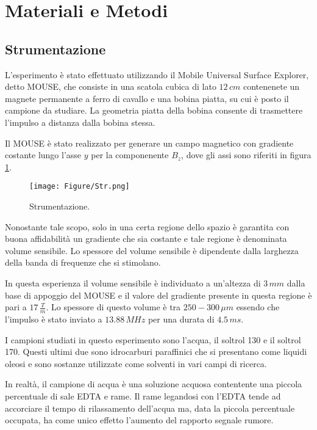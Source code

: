 \section*{Materiali e Metodi}

\subsection*{Strumentazione}

L'esperimento è stato effettuato utilizzando il Mobile Universal Surface Explorer, detto MOUSE, che consiste in una scatola cubica di lato $12\,cm$ contenenete un magnete permanente a ferro di cavallo e una bobina piatta, su cui è posto il campione da studiare. 
La geometria piatta della bobina consente di trasmettere l'impulso a distanza dalla bobina stessa. 

Il MOUSE è stato realizzato per generare un campo magnetico con gradiente costante lungo l'asse $y$ per la componenente $B_z$, dove gli assi sono riferiti in figura \ref{fig:Str.png}. 

\begin{figure}[h!]
\centering
\texttt{[image: Figure/Str.png]}
\caption{Strumentazione.}
\label{fig:Str.png}
\end{figure}

Nonostante tale scopo, solo in una certa regione dello spazio è garantita con buona affidabilità un gradiente che sia costante e tale regione è denominata volume sensibile.
Lo spessore del volume sensibile è dipendente dalla larghezza della banda di frequenze che si stimolano.

In questa esperienza il volume sensibile è individuato a un'altezza di $3\,mm$ dalla base di appoggio del MOUSE e il valore del gradiente presente in questa regione è pari a $17\, \frac{T}{m}$.
Lo spessore di questo volume è tra $250-300\, \mu m$ essendo che l'impulso è stato inviato a $13.88\,MHz$ per una durata di $4.5\,ms$. 

I campioni studiati in questo esperimento sono l'acqua, il soltrol 130 e il soltrol 170.
Questi ultimi due sono idrocarburi paraffinici che si presentano come liquidi oleosi e sono sostanze utilizzate come solventi in vari campi di ricerca.

In realtà, il campione di acqua è una soluzione acquosa contentente una piccola percentuale di sale EDTA e rame.
Il rame legandosi con l'EDTA tende ad accorciare il tempo di rilassamento dell'acqua ma, data la piccola percentuale occupata, ha come unico effetto l'aumento del rapporto segnale rumore.

